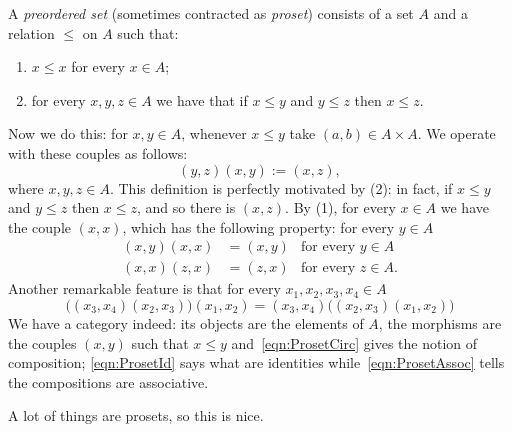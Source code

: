\begin{example}
A {\em preordered set} (sometimes contracted as {\em proset}) consists of a set \(A\) and a relation \(\le\) on \(A\) such that:
\begin{enumerate}
\item \(x \le x\) for every \(x \in A\);
\item for every \(x, y, z \in A\) we have that if \(x \le y\) and \(y \le z\) then \(x \le z\).
\end{enumerate}
Now we do this: for \(x, y \in A\), whenever \(x \le y\) take \((a, b) \in A \times A\). We operate with these couples as follows:
\begin{equation}
(y, z) (x, y) := (x, z), \label{eqn:ProsetCirc}
\end{equation}
where \(x, y, z \in A\). This definition is perfectly motivated by (2): in fact, if \(x \le y\) and \(y \le z\) then \(x \le z\), and so there is \((x, z)\). By (1), for every \(x \in A\) we have the couple \((x, x)\), which has the following property: for every \(y \in A\)
\begin{equation}
\begin{aligned}
(x, y) (x, x) &= (x, y) & \text{for every } y \in A \\
(x, x) (z, x) &= (z, x) & \text{for every } z \in A .
\end{aligned}\label{eqn:ProsetId}
\end{equation}
Another remarkable feature is that for every \(x_1, x_2, x_3, x_4 \in A\)
\begin{equation}
\big((x_3, x_4)(x_2, x_3)\big)(x_1, x_2) = (x_3, x_4)\big((x_2, x_3)(x_1, x_2)\big)\label{eqn:ProsetAssoc}
\end{equation}
We have a category indeed: its objects are the elements of \(A\), the morphisms are the couples \((x, y)\) such that \(x \le y\) and~\eqref{eqn:ProsetCirc} gives the notion of composition; \eqref{eqn:ProsetId} says what are identities while~\eqref{eqn:ProsetAssoc} tells the compositions are associative.
\end{example}

A lot of things are prosets, so this is nice.

